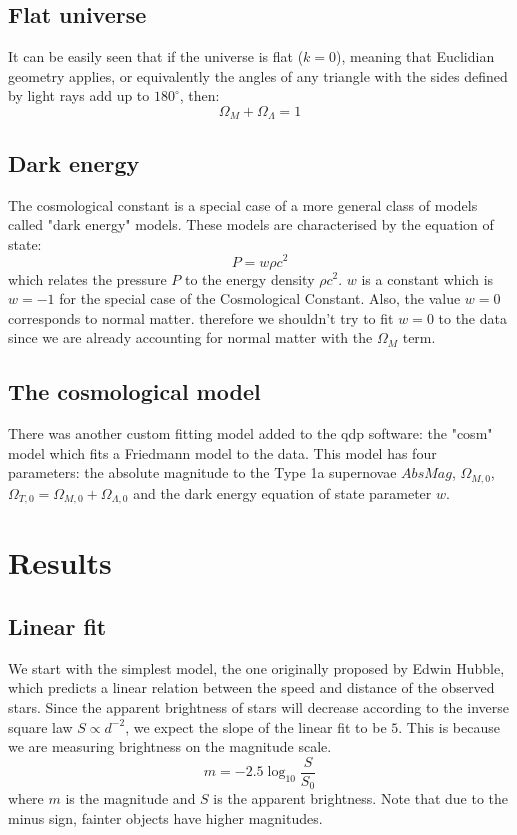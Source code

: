 \documentclass[11pt]{article}
\begin{document}
\subsection{Flat universe}
It can be easily seen that if the universe is flat ($k = 0$), meaning that Euclidian geometry applies, or equivalently the angles of any triangle with the sides defined by light rays add up to $180^\circ$, then: 
\begin{equation}
	\Omega_M + \Omega_\Lambda = 1
	\label{eq:flat}
\end{equation}

\subsection{Dark energy}
The cosmological constant is a special case of a more general class of models called "dark energy" models. These models are characterised by the equation of state:
\begin{equation}
	P = w \rho c^2
	\label{eq:dark}
\end{equation}
which relates the pressure $P$ to the energy density $\rho c^2$. $w$ is a constant which is $w = -1$ for the special case of the Cosmological Constant. Also, the value $w = 0$ corresponds to normal matter. therefore we shouldn't try to fit $w = 0$ to the data since we are already accounting for normal matter with the $\Omega_M$ term. 

\subsection{The cosmological model}
There was another custom fitting model added to the qdp software: the "cosm" model which fits a Friedmann model to the data. This model has four parameters: the absolute magnitude to the Type 1a supernovae $AbsMag$, $\Omega_{M,0}$, $\Omega_{T,0} = \Omega_{M,0} + \Omega_{\Lambda,0}$ and the dark energy equation of state parameter $w$.

\section{Results}
\subsection{Linear fit}
We start with the simplest model, the one originally proposed by Edwin Hubble, which predicts a linear relation between the speed and distance of the observed stars. Since the apparent brightness of stars will decrease according to the inverse square law $S \propto d^{-2}$, we expect the slope of the linear fit to be $5$. This is because we are measuring brightness on the magnitude scale.
\begin{equation}
	m = -2.5\log_{10}\frac{S}{S_0}
	\label{eq:mag}
\end{equation}
where $m$ is the magnitude and  $S$ is the apparent brightness. Note that due to the minus sign, fainter objects have higher magnitudes. 
\end{document}
